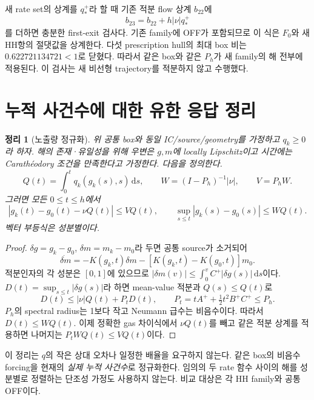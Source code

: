 \documentclass[11pt,a4paper]{article}
\newcommand{\dd}{\mathrm d}\newcommand{\HH}{\mathrm{HH}}\newcommand{\eV}{\mathrm{eV}}
\newtheorem{theorem}{정리}[section]
\begin{document}
새 rate set의 상계를 $q_*^+$라 할 때 기존 적분 flow 상계 $b_{22}$에
\begin{equation}
b_{23}=b_{22}+h|\nu|q_*^+
\end{equation}
를 더하면 충분한 first-exit 검사다. 기존 family에 OFF가 포함되므로 이 식은 $F_0$와 새 HH항의 절댓값을 상계한다. 다섯 prescription hull의 최대 box 비는 $0.622721134721<1$로 닫혔다. 따라서 같은 box와 같은 $P_h$가 새 family의 해 전부에 적용된다. 이 검사는 새 비선형 trajectory를 적분하지 않고 수행했다.

\newpage
\section{누적 사건수에 대한 유한 응답 정리}
\begin{theorem}[노출량 정규화]
위 공통 box와 동일 IC/source/geometry를 가정하고 $q_k\ge0$라 하자. 해의 존재·유일성을 위해 우변은 $g,m$에 locally Lipschitz이고 시간에는 Carath\'eodory 조건을 만족한다고 가정한다. 다음을 정의한다.
\begin{equation}
Q(t)=\int_0^tq_k(g_k(s),s)\,\dd s,\qquad
W=(I-P_h)^{-1}|\nu|,\qquad V=P_hW.
\end{equation}
그러면 모든 $0\le t\le h$에서
\begin{equation}\label{eq:cone}
|g_k(t)-g_0(t)-\nu Q(t)|\le VQ(t),\qquad
\sup_{s\le t}|g_k(s)-g_0(s)|\le WQ(t).
\end{equation}
벡터 부등식은 성분별이다.
\end{theorem}
\begin{proof}
$\delta g=g_k-g_0$, $\delta m=m_k-m_0$라 두면 공통 source가 소거되어
\begin{equation}
\dot{\delta m}=-K(g_k,t)\delta m-[K(g_k,t)-K(g_0,t)]m_0.
\end{equation}
적분인자의 각 성분은 $[0,1]$에 있으므로
$|\delta m(v)|\le\int_0^v C^+|\delta g(s)|\,\dd s$이다.
$D(t)=\sup_{s\le t}|\delta g(s)|$라 하면 mean-value 적분과 $Q(s)\le Q(t)$로
\begin{equation}
D(t)\le |\nu|Q(t)+P_tD(t),\qquad
P_t=tA^++\tfrac12t^2B^+C^+\le P_h.
\end{equation}
$P_h$의 spectral radius는 1보다 작고 Neumann 급수는 비음수이다. 따라서 $D(t)\le WQ(t)$. 이제 정확한 gas 차이식에서 $\nu Q(t)$를 빼고 같은 적분 상계를 적용하면 나머지는 $P_tWQ(t)\le VQ(t)$이다.
\end{proof}

이 정리는 $q$의 작은 상대 오차나 일정한 배율을 요구하지 않는다. 같은 box의 비음수 forcing을 현재의 \emph{실제 누적 사건수}로 정규화한다. 임의의 두 rate 함수 사이의 해를 성분별로 정렬하는 단조성 가정도 사용하지 않는다. 비교 대상은 각 HH family와 공통 OFF이다.
\end{document}

